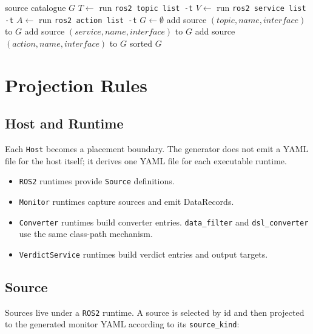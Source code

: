 \documentclass[11pt]{article}
\begin{document}
\begin{algorithm}[H]
\caption{Scan ROS2 sources}
\begin{algorithmic}[1]
\Ensure source catalogue $G$
\State $T \gets$ run \texttt{ros2 topic list -t}
\State $V \gets$ run \texttt{ros2 service list -t}
\State $A \gets$ run \texttt{ros2 action list -t}
\State $G \gets \emptyset$
  \State add source $(topic,name,interface)$ to $G$
\EndFor
{}
  \State add source $(service,name,interface)$ to $G$
\EndFor
{}
  \State add source $(action,name,interface)$ to $G$
\EndFor
\State \Return sorted $G$
\end{algorithmic}
\end{algorithm}

\clearpage
\section{Projection Rules}

\subsection{Host and Runtime}

Each \texttt{Host} becomes a placement boundary. The generator does not emit a
YAML file for the host itself; it derives one YAML file for each executable
runtime.

\begin{itemize}
  \item \texttt{ROS2} runtimes provide \texttt{Source} definitions.
  \item \texttt{Monitor} runtimes capture sources and emit DataRecords.
  \item \texttt{Converter} runtimes build converter entries. \texttt{data\_filter}
        and \texttt{dsl\_converter} use the same class-path mechanism.
  \item \texttt{VerdictService} runtimes build verdict entries and output targets.
\end{itemize}

\subsection{Source}

Sources live under a \texttt{ROS2} runtime. A source is selected by id and then
projected to the generated monitor YAML according to its
\texttt{source\_kind}:
\end{document}
